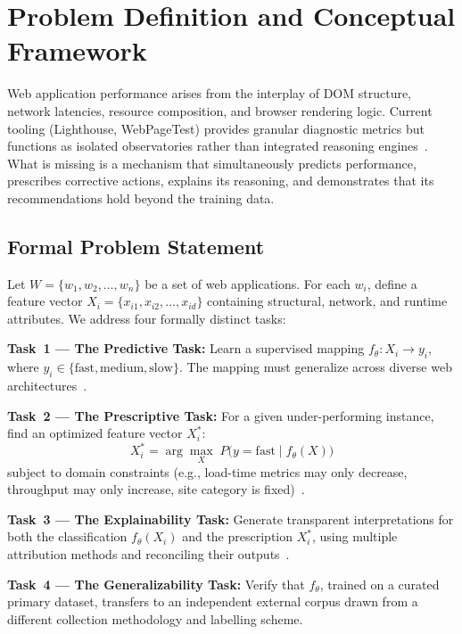 \documentclass[sn-nature]{sn-jnl}
\begin{document}
\section{Problem Definition and Conceptual Framework}\label{sec3}

Web application performance arises from the interplay of DOM structure, network latencies, resource composition, and browser rendering logic. Current tooling (Lighthouse, WebPageTest) provides granular diagnostic metrics but functions as isolated observatories rather than integrated reasoning engines~\cite{ghattas2025, vanriet2023}. What is missing is a mechanism that simultaneously predicts performance, prescribes corrective actions, explains its reasoning, and demonstrates that its recommendations hold beyond the training data.

\subsection{Formal Problem Statement}

Let $W = \{w_1, w_2, \dots, w_n\}$ be a set of web applications. For each $w_i$, define a feature vector $X_i = \{x_{i1}, x_{i2}, \dots, x_{id}\}$ containing structural, network, and runtime attributes. We address four formally distinct tasks:

\textbf{Task~1 --- The Predictive Task:} Learn a supervised mapping $f_\theta : X_i \rightarrow y_i$, where $y_i \in \{\text{fast}, \text{medium}, \text{slow}\}$. The mapping must generalize across diverse web architectures~\cite{ghattas2025, sehwag2024}.

\textbf{Task~2 --- The Prescriptive Task:} For a given under-performing instance, find an optimized feature vector $X_i^*$:
\[
X_i^* = \arg\max_{X}\; P\bigl(y = \text{fast} \mid f_\theta(X)\bigr)
\]
subject to domain constraints (e.g., load-time metrics may only decrease, throughput may only increase, site category is fixed)~\cite{notz2024, asha2025}.

\textbf{Task~3 --- The Explainability Task:} Generate transparent interpretations for both the classification $f_\theta(X_i)$ and the prescription $X_i^*$, using multiple attribution methods and reconciling their outputs~\cite{salih2024, goldwasser2024}.

\textbf{Task~4 --- The Generalizability Task:} Verify that $f_\theta$, trained on a curated primary dataset, transfers to an independent external corpus drawn from a different collection methodology and labelling scheme.
\end{document}
